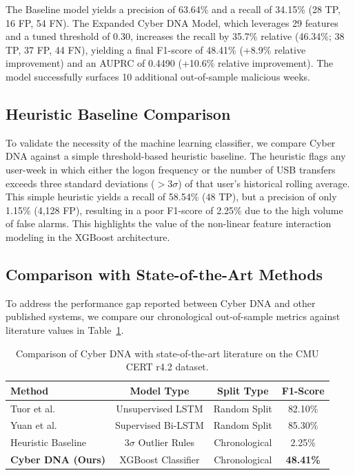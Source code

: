 \documentclass[pdflatex,sn-mathphys-num]{sn-jnl}
\theoremstyle{thmstyleone}
\theoremstyle{thmstyletwo}
\theoremstyle{thmstylethree}
\begin{document}
The Baseline model yields a precision of 63.64\% and a recall of 34.15\% (28 TP, 16 FP, 54 FN). The Expanded Cyber DNA Model, which leverages 29 features and a tuned threshold of 0.30, increases the recall by 35.7\% relative (46.34\%; 38 TP, 37 FP, 44 FN), yielding a final F1-score of 48.41\% (+8.9\% relative improvement) and an AUPRC of 0.4490 (+10.6\% relative improvement). The model successfully surfaces 10 additional out-of-sample malicious weeks.

\subsection{Heuristic Baseline Comparison}\label{subsec5_1}
To validate the necessity of the machine learning classifier, we compare Cyber DNA against a simple threshold-based heuristic baseline. The heuristic flags any user-week in which either the logon frequency or the number of USB transfers exceeds three standard deviations ($>3\sigma$) of that user's historical rolling average. This simple heuristic yields a recall of 58.54\% (48 TP), but a precision of only 1.15\% (4,128 FP), resulting in a poor F1-score of 2.25\% due to the high volume of false alarms. This highlights the value of the non-linear feature interaction modeling in the XGBoost architecture.

\subsection{Comparison with State-of-the-Art Methods}\label{subsec5_2}
To address the performance gap reported between Cyber DNA and other published systems, we compare our chronological out-of-sample metrics against literature values in Table~\ref{tab:sota}.

\begin{table}[h]
\caption{Comparison of Cyber DNA with state-of-the-art literature on the CMU CERT r4.2 dataset.}\label{tab:sota}
\begin{tabular*}{\textwidth}{@{\extracolsep\fill}lccc}
\toprule
Method & Model Type & Split Type & F1-Score \\
\midrule
Tuor et al. \cite{tuor2017deep} & Unsupervised LSTM & Random Split & 82.10\% \\
Yuan et al. \cite{yuan2021deep} & Supervised Bi-LSTM & Random Split & 85.30\% \\
Heuristic Baseline & $3\sigma$ Outlier Rules & Chronological & 2.25\% \\
\textbf{Cyber DNA (Ours)} & XGBoost Classifier & Chronological & \textbf{48.41\%} \\
\bottomrule
\end{tabular*}
\end{table}
\end{document}
